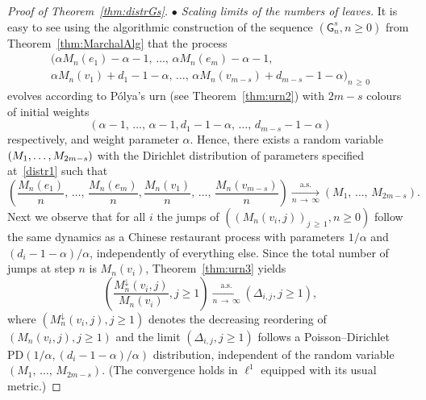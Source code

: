 \documentclass[10pt]{amsart}
\theoremstyle{definition}\newtheorem{defi}[theo]{Definition}\newtheorem{rema}[theo]{Remark}\newtheorem{exam}[theo]{Example}\newtheorem{exem}[theo]{Example}\newtheorem{nota}[theo]{Notation}
\newcommand{\PD}{\mathrm{PD}}
\newcommand{\sG}{\mathsf{G}}
\begin{document}
\begin{proof}[Proof of Theorem~\ref{thm:distrGs}]
\emph{$\bullet$ Scaling limits of the numbers of leaves.} It is easy to see using the algorithmic construction of the sequence $(\sG_n^s,n\geq 0)$ from Theorem~\ref{thm:MarchalAlg} that the process
\begin{multline*}
\big(\alpha M_n(e_1)-\alpha-1,\,\ldots,\,\alpha M_n(e_m)-\alpha-1, \\
\alpha M_n(v_1)+d_1-1-\alpha,\,\ldots,\,\alpha M_n\left(v_{m-s}\right) + d_{m-s} - 1 - \alpha \big)_{n\,\geq\,0}
\end{multline*}
evolves according to P\'olya's urn (see Theorem~\ref{thm:urn2}) with $2m-s$ colours of initial weights
\[
\left(\alpha-1,\,\ldots,\,\alpha-1,d_1-1-\alpha,\,\ldots,\,d_{m-s}-1-\alpha\right)
\]
respectively, and weight parameter $\alpha$. Hence, there exists a random variable $(M_1,\ldots,\linebreak M_{2m-s})$ with the Dirichlet distribution of parameters specified at~\eqref{distr1} such that
\[
\left(\frac{M_n(e_1)}{n},\,\ldots,\,\frac{M_n(e_m)}{n},\frac{M_n(v_1)}{n},\,\ldots,\,\frac{M_n\left(v_{m-s}\right)}{n}\right) \underset{n \,\rightarrow\,\infty}{\overset{\text{a.s.}}\longrightarrow} \left(M_1,\,\ldots,\,M_{2m-s}\right).
\]
Next we observe that for all $i$ the jumps of $((M_{n}(v_{i},j))_{j\,\geq\,1},n \geq 0)$ follow the same dynamics as a Chinese restaurant process with parameters $1/\alpha$ and $(d_i-1-\alpha)/\alpha$, independently of everything else. Since the total number of jumps at step $n$ is $M_n(v_i)$, Theorem~\ref{thm:urn3} yields
\[
\left(\frac{M^{\downarrow}_{n}\left(v_{i},j\right)}{M_n(v_i)},j\geq 1\right) \underset{n\,\rightarrow \,\infty}{\overset{\text{a.s.}}\longrightarrow} \left(\Delta_{i,j},j\geq 1\right),
\]
where $(M^{\downarrow}_{n}(v_{i},j),j\geq 1)$ denotes the decreasing reordering of $(M_{n}(v_{i},j),j\geq 1)$ and the limit $(\Delta_{i,j},j\geq 1)$ follows a Poisson--Dirichlet $\PD(1/\alpha, (d_i-1-\alpha)/\alpha)$ distribution, independent of the random variable $(M_1,\,\ldots,\,M_{2m-s})$. (The convergence holds in $\ell^1$ equipped with its usual metric.)

\vspace{4pt}


\end{proof}
\end{document}
